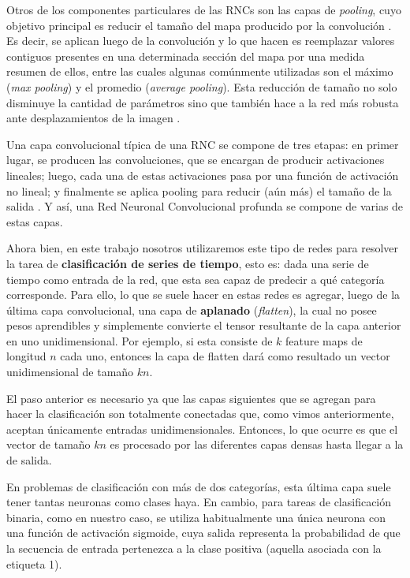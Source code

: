 \documentclass[../../main.tex]{subfiles}
\begin{document}
Otros de los componentes particulares de las RNCs son las capas de \textit{pooling}, cuyo
objetivo principal es reducir el tamaño del mapa producido por la convolución
\cite{hands-on-ML-sklearn-tf}. Es decir, se aplican luego de la convolución y lo que hacen
es reemplazar valores contiguos presentes en una determinada sección del mapa por una medida
resumen de ellos, entre las cuales algunas comúnmente utilizadas son el máximo
(\textit{max pooling}) y el promedio (\textit{average pooling}). Esta reducción de tamaño
no solo disminuye la cantidad de parámetros sino que también hace a la red más robusta
ante desplazamientos de la imagen \cite{hands-on-ML-sklearn-tf}.

Una capa convolucional típica de una RNC se compone de tres etapas: en primer lugar, se
producen las convoluciones, que se encargan de producir activaciones lineales; luego, cada
una de estas activaciones pasa por una función de activación no lineal; y finalmente se
aplica pooling para reducir (aún más) el tamaño de la salida \cite{deep-learning}. Y así,
una Red Neuronal Convolucional profunda se compone de varias de estas capas.

\bigskip
Ahora bien, en este trabajo nosotros utilizaremos este tipo de redes para resolver la
tarea de \textbf{clasificación de series de tiempo}, esto es: dada una serie de tiempo
como entrada de la red, que esta sea capaz de predecir a qué categoría corresponde. Para
ello, lo que se suele hacer en estas redes es agregar, luego de la última capa
convolucional, una capa de \textbf{aplanado} (\textit{flatten}), la cual no posee pesos
aprendibles y simplemente convierte el tensor resultante de la capa anterior en uno
unidimensional. Por ejemplo, si esta consiste de \(k\) feature maps de longitud \(n\) cada
uno, entonces la capa de flatten dará como resultado un vector unidimensional de tamaño
\(kn\).

El paso anterior es necesario ya que las capas siguientes que se agregan para hacer la
clasificación son totalmente conectadas que, como vimos anteriormente, aceptan únicamente
entradas unidimensionales. Entonces, lo que ocurre es que el vector de tamaño \(kn\) es
procesado por las diferentes capas densas hasta llegar a la de salida.

En problemas de clasificación con más de dos categorías, esta última capa suele tener
tantas neuronas como clases haya. En cambio, para tareas de clasificación binaria, como en
nuestro caso, se utiliza habitualmente una única neurona con una función de activación
sigmoide, cuya salida representa la probabilidad de que la secuencia de entrada pertenezca
a la clase positiva (aquella asociada con la etiqueta 1).
\end{document}
